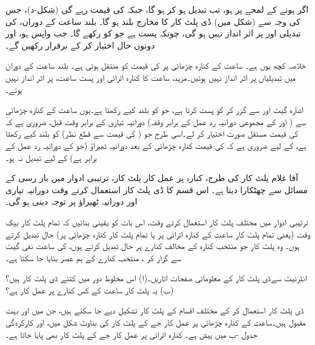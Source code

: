  اگر  ہونے کے لمحے پر  ہو، تب  تبدیل ہو کر  ہو گا، جبکہ  کی قیمت  رہے گی (شکل-د)، جس کی وجہ سے (شکل  میں) ڈی پلٹ کار کا مخارج  بلند  ہو گا۔ بلند ساعت  کے دوران،  کی تبدیلی  اور  پر اثر انداز نہیں ہو گی، چونکہ  پست  ہے جو  کو  رکھے گا۔ جب  واپس  ہو،  اور  دونوں  حال اختیار کر کے  برقرار رکھیں گے۔
 
 خلاصہ کچھ یوں ہے۔ ساعت کے کنارہ چڑھائی پر  کی قیمت  کو منتقل ہوتی ہے۔ بلند ساعت کے دوران  میں تبدیلیاں  پر اثر انداز نہیں ہوتیں۔مزید، ساعت کا کنارہ اترائی اور پست ساعت،  پر اثر انداز نہیں ہوتے۔
 
 اشارہ  گیٹ  اور  سے گزر کر  کو پست کرتا ہے، جو  کو بلند کیے رکھتا ہے۔یوں ساعت کے کنارہ چڑھائی سے ( اور  کے مجموعی دورانیہ رد عمل کے برابر وقفہ) دورانیہ تیاری کے برابر وقت قبل، ضروری ہے کہ کی قیمت مستقل صورت اختیار کر لے۔اسی طرح  جو ( کی قیمت سے قطع نظر)  کو بلند کیے رکھتا ہے، کے لیے ضروری ہے کہ  کی قیمت کنارہ چڑھائی کے بعد دورانیہ ٹھیراؤ (جو  کے دورانیہ رد عمل کے برابر ہے) کے لیے تبدیل نہ ہو۔
 
 آقا غلام پلٹ کار کی طرح، کنارہ پر عمل کار پلٹ کار، ترتیبی ادوار میں باز رسی کے مسائل سے چھٹکارا دیتا ہے۔ اس قسم کا ڈی پلٹ کار استعمال کرتے وقت دورانیہ تیاری اور دورانیہ ٹھیراؤ پر توجہ دینی ہو گی۔ 

ترتیبی ادوار میں مختلف پلٹ کار استعمال کرتے وقت، اس بات کو یقینی بنائیں کہ تمام پلٹ کار بیک وقت (یعنی تمام پلٹ کار ساعت کے کنارہ اترائی پر یا تمام پلٹ کار کنارہ چڑھائی پر) حال تبدیل کرتے ہوں۔ وہ پلٹ کار جو منتخب کنارہ کے مخالف کنارے پر حال تبدیل کرتے ہوں، کی ساعت نفی گیٹ سے گزار کر ، منتخب کنارے کے ہم عصر بنایا جا سکتا ہے۔


انٹرنیٹ سےڈی پلٹ کار کے معلوماتی صفحات اتاریں۔(ا) اس مخلوط دور میں کتنے ڈی پلٹ کار ہیں؟ (ب) یہ پلٹ کار ساعت کے کس کنارے پر عمل کار ہے؟


ڈی پلٹ کار استعمال کر کے مختلف اقسام کے پلٹ کار تشکیل دیے جا سکتے ہیں، جن میں  اور  بہت مقبول ہیں۔ساعت کے کنارہ چڑھائی پر عمل کار جے کے پلٹ کار کی بناوٹ شکل  میں، اور کارکردگی جدول -ب میں پیش ہے۔ کنارہ اترائی پر عمل کار جے کے پلٹ کار بھی پایا جاتا ہے۔

